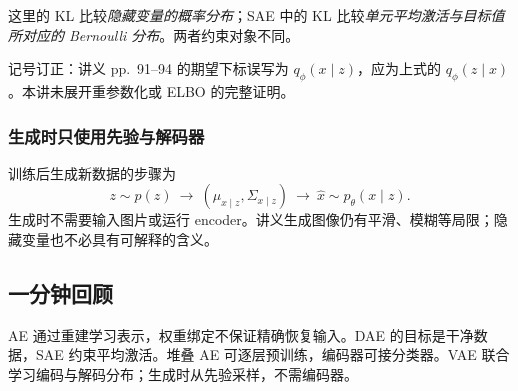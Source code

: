 这里的 KL 比较\emph{隐藏变量的概率分布}；SAE 中的 KL 比较\emph{单元平均激活与目标值所对应的 Bernoulli 分布}。两者约束对象不同。

{\small 记号订正：讲义 pp.~91--94 的期望下标误写为 $q_\phi(x\mid z)$，应为上式的 $q_\phi(z\mid x)$。本讲未展开重参数化或 ELBO 的完整证明。}

\subsubsection{生成时只使用先验与解码器}

训练后生成新数据的步骤为
\[
 z\sim p(z)
 \ \longrightarrow\ (\mu_{x\mid z},\Sigma_{x\mid z})
 \ \longrightarrow\ \hat x\sim p_\theta(x\mid z).
\]
生成时不需要输入图片或运行 encoder。讲义生成图像仍有平滑、模糊等局限；隐藏变量也不必具有可解释的含义。

\subsection{一分钟回顾}

AE 通过重建学习表示，权重绑定不保证精确恢复输入。DAE 的目标是干净数据，SAE 约束平均激活。堆叠 AE 可逐层预训练，编码器可接分类器。VAE 联合学习编码与解码分布；生成时从先验采样，不需编码器。
